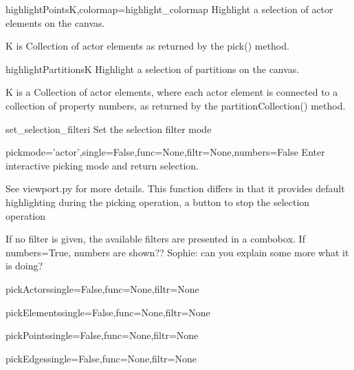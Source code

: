 \begin{funcdesc}{highlightPoints}{K,colormap=highlight_colormap}
Highlight a selection of actor elements on the canvas.

K is Collection of actor elements as returned by the pick() method.


\end{funcdesc}

\begin{funcdesc}{highlightPartitions}{K}
Highlight a selection of partitions on the canvas.

K is a Collection of actor elements, where each actor element is
connected to a collection of property numbers, as returned by the
partitionCollection() method.

\end{funcdesc}

\begin{funcdesc}{set_selection_filter}{i}
Set the selection filter mode
\end{funcdesc}

\begin{funcdesc}{pick}{mode='actor',single=False,func=None,filtr=None,numbers=False}
Enter interactive picking mode and return selection.

See viewport.py for more details.
This function differs in that it provides default highlighting
during the picking operation, a button to stop the selection operation

If no filter is given, the available filters are presented in a combobox.
If numbers=True, numbers are shown?? Sophie: can you explain some more
what it is doing?

\end{funcdesc}

\begin{funcdesc}{pickActors}{single=False,func=None,filtr=None}
\end{funcdesc}

\begin{funcdesc}{pickElements}{single=False,func=None,filtr=None}
\end{funcdesc}

\begin{funcdesc}{pickPoints}{single=False,func=None,filtr=None}
\end{funcdesc}

\begin{funcdesc}{pickEdges}{single=False,func=None,filtr=None}
\end{funcdesc}

